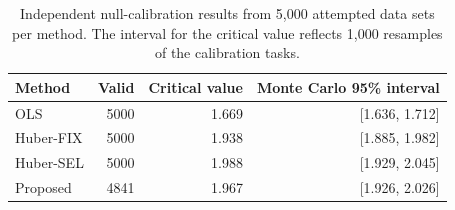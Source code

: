 \begin{table}[htbp]
\centering\small
\caption{Independent null-calibration results from 5,000 attempted data sets per method. The interval for the critical value reflects 1,000 resamples of the calibration tasks.}
\label{tab:power-critical}
\begin{tabular}{lrrr}
\toprule
Method & Valid & Critical value & Monte Carlo 95\% interval \\ \midrule
OLS & 5000 & 1.669 & [1.636, 1.712] \\
Huber-FIX & 5000 & 1.938 & [1.885, 1.982] \\
Huber-SEL & 5000 & 1.988 & [1.929, 2.045] \\
Proposed & 4841 & 1.967 & [1.926, 2.026] \\
\bottomrule\end{tabular}
\end{table}
